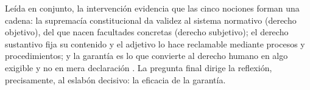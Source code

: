 \documentclass[
  spanish,
  letterpaper, oneside
]{article}
\begin{document}
Leída en conjunto, la intervención evidencia que las cinco nociones forman una cadena: la supremacía constitucional da validez al sistema normativo (derecho objetivo), del que nacen facultades concretas (derecho subjetivo); el derecho sustantivo fija su contenido y el adjetivo lo hace reclamable mediante procesos y procedimientos; y la garantía es lo que convierte al derecho humano en algo exigible y no en mera declaración \citep{cpeum2026,leyAmparo2026}. La pregunta final dirige la reflexión, precisamente, al eslabón decisivo: la eficacia de la garantía.

%
%
\end{document}
